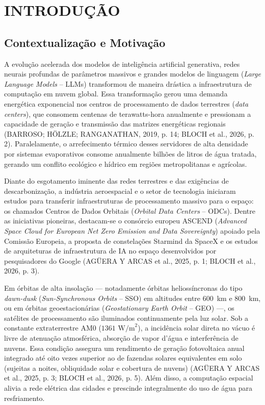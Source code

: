 \section{INTRODUÇÃO}

\subsection{Contextualização e Motivação}

A evolução acelerada dos modelos de inteligência artificial generativa, redes neurais profundas de parâmetros massivos e grandes modelos de linguagem (\textit{Large Language Models} -- LLMs) transformou de maneira drástica a infraestrutura de computação em nuvem global. Essa transformação gerou uma demanda energética exponencial nos centros de processamento de dados terrestres (\textit{data centers}), que consomem centenas de terawatts-hora anualmente e pressionam a capacidade de geração e transmissão das matrizes energéticas regionais (BARROSO; HÖLZLE; RANGANATHAN, 2019, p. 14; BLOCH et al., 2026, p. 2). Paralelamente, o arrefecimento térmico desses servidores de alta densidade por sistemas evaporativos consome anualmente bilhões de litros de água tratada, gerando um conflito ecológico e hídrico em regiões metropolitanas e agrícolas.

Diante do esgotamento iminente das redes terrestres e das exigências de descarbonização, a indústria aeroespacial e o setor de tecnologia iniciaram estudos para transferir infraestruturas de processamento massivo para o espaço: os chamados Centros de Dados Orbitais (\textit{Orbital Data Centers} -- ODCs). Dentre as iniciativas pioneiras, destacam-se o consórcio europeu ASCEND (\textit{Advanced Space Cloud for European Net Zero Emission and Data Sovereignty}) apoiado pela Comissão Europeia, a proposta de constelações Starmind da SpaceX e os estudos de arquiteturas de infraestrutura de IA no espaço desenvolvidos por pesquisadores do Google (AGÜERA Y ARCAS et al., 2025, p. 1; BLOCH et al., 2026, p. 3).

Em órbitas de alta insolação — notadamente órbitas heliossíncronas do tipo \textit{dawn-dusk} (\textit{Sun-Synchronous Orbits} -- SSO) em altitudes entre 600~km e 800~km, ou em órbitas geoestacionárias (\textit{Geostationary Earth Orbit} -- GEO) —, os satélites de processamento são iluminados continuamente pela luz solar. Sob a constante extraterrestre AM0 ($1361\text{ W/m}^2$), a incidência solar direta no vácuo é livre de atenuação atmosférica, absorção de vapor d'água e interferência de nuvens. Essa condição assegura um rendimento de geração fotovoltaica anual integrado até oito vezes superior ao de fazendas solares equivalentes em solo (sujeitas a noites, obliquidade solar e cobertura de nuvens) (AGÜERA Y ARCAS et al., 2025, p. 3; BLOCH et al., 2026, p. 5). Além disso, a computação espacial alivia a rede elétrica das cidades e prescinde integralmente do uso de água para resfriamento.

